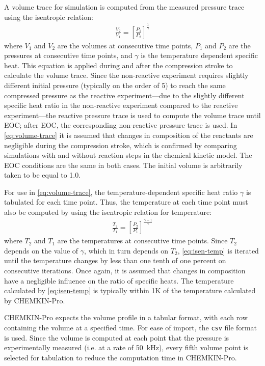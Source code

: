 \documentclass[../main.tex]{subfiles}
\begin{document}
A volume trace for simulation is computed from the measured
pressure trace using the isentropic relation:
%
\begin{align}
\frac{V_2}{V_1} = \left[\frac{P_1}{P_2}\right]^{\frac{1}{\gamma}}
\label{eq:volume-trace}
\end{align}
%
where $V_1$ and $V_2$ are the volumes at consecutive time points,
$P_1$ and $P_2$ are the pressures at consecutive time points, and
$\gamma$ is the temperature dependent specific heat. This equation
is applied during and after the compression stroke to calculate
the volume trace. Since the non-reactive experiment requires slightly
different initial pressure (typically on the order of \SI{5}{\torr}) to reach the same
compressed pressure as the reactive experiment---due to the slightly
different specific heat ratio in the non-reactive experiment compared
to the reactive experiment---the reactive pressure trace is used to
compute the volume trace until EOC; after EOC, the corresponding
non-reactive pressure trace is used. In \cref{eq:volume-trace} it is assumed that
changes in composition of the reactants are negligible during the
compression stroke, which is confirmed by comparing simulations with and
without reaction steps in the chemical kinetic model. The EOC conditions
are the same in both cases. The initial volume is arbitrarily taken
to be equal to \num{1.0}.

For use in \cref{eq:volume-trace}, the temperature-dependent specific
heat ratio $\gamma$ is tabulated for each time point. Thus, the
temperature at each time point must also be computed by using the
isentropic relation for temperature:
%
\begin{align}
\frac{T_2}{T_1} = \left[\frac{P_2}{P_1}\right]^{\frac{\gamma-1}{\gamma}}
\label{eq:isen-temp}
\end{align}
%
where $T_2$ and $T_1$ are the temperatures at consecutive time points.
Since $T_2$ depends on the value of $\gamma$, which in turn depends
on $T_2$, \cref{eq:isen-temp} is iterated until the temperature
changes by less than one tenth of one percent on consecutive iterations.
Once again, it is assumed that changes in composition have a negligible
influence on the ratio of specific heats.
The temperature calculated by \cref{eq:isen-temp} is typically within
1K of the temperature calculated by CHEMKIN-Pro.

CHEMKIN-Pro expects the volume profile in a tabular format, with each row
containing the volume at a specified time. For ease of import, the
\texttt{csv} file format is used. Since the volume is computed at each
point that the pressure is experimentally measured (i.e. at a rate of
\SI{50}{\kilo\hertz}), every fifth volume point is selected for tabulation
to reduce the computation time in CHEMKIN-Pro.
\end{document}

